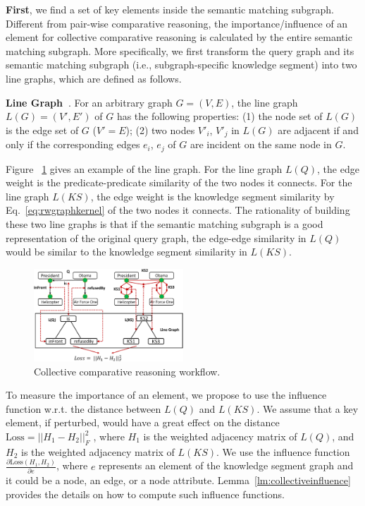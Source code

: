 \textbf{First}, we find a set of key elements inside the semantic matching subgraph.
Different from pair-wise comparative reasoning, the importance/influence of an element for collective comparative reasoning is calculated by the entire semantic matching subgraph.
More specifically,
we first transform the query graph and its semantic matching subgraph (i.e., subgraph-specific knowledge segment) into two line graphs, which are defined as follows.
\vspace{-0.5\baselineskip}
\begin{definition} {\bf Line Graph~\cite{Shiralkar2017}}.
For an arbitrary graph $G=(V, E)$, the line graph $L(G) = (V', E')$ of  $G$ has the following properties:
(1) the node set of $L(G)$ is the edge set of $G$ ($V' = E$);
(2) two nodes $V'_i$, $V'_j$ in $L(G)$ are adjacent if and only if the corresponding edges $e_i$, $e_j$ of $G$ are incident on the same node in $G$.
\end{definition}
\vspace{-0.5\baselineskip}
Figure ~\ref{collective-compare-workflow} gives an example of the line graph.
For the line graph $L(Q)$, the edge weight is the predicate-predicate similarity of the two nodes it connects.
For the line graph $L(KS)$, the edge weight is the knowledge segment similarity by Eq.~\eqref{eq:rwgraphkernel} of the two nodes it connects.
The rationality of building these two line graphs is that if the semantic matching subgraph is a good representation of the original query graph, the edge-edge similarity in $L(Q)$ would be similar to the knowledge segment similarity in $L(KS)$.

\begin{figure}
	\centering
	\vspace{-1\baselineskip}
	\includegraphics[width=0.5\textwidth]{submissions/logical-queries-uiuc/img/line-loss.pdf}
	\caption{Collective comparative reasoning workflow.}
	\label{collective-compare-workflow}
	\vspace{-1\baselineskip}
\end{figure}

To measure the importance of an element, we propose to use the influence function w.r.t. the distance between $L(Q)$ and $L(KS)$. We assume that a key element, if perturbed, would have a great effect on the distance
$\textrm{Loss} = || H_1 - H_2 ||_F^2$
, where $H_1$ is the weighted adjacency matrix of $L(Q)$, and $H_2$ is the weighted adjacency matrix of $L(KS)$. We use the influence function $\frac{\partial \textrm{Loss}(H_1, H_2)}{\partial e}$, where $e$ represents an element of the knowledge segment graph and it could be a node, an edge, or a node attribute. Lemma~\ref{lm:collectiveinfluence} provides the details on how to compute such influence functions.

